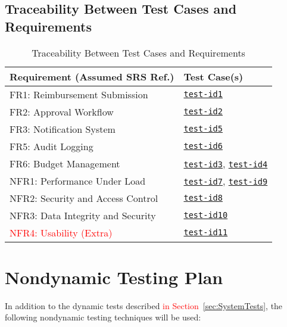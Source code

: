 \documentclass[12pt, titlepage]{article}
\begin{document}
\subsection{Traceability Between Test Cases and Requirements}

\begin{table}[h]
  \centering
  \caption{Traceability Between Test Cases and Requirements}
  \label{tab:req_test_trace}
  \begin{tabular}{|l|l|}
      \hline
      \textbf{Requirement (Assumed SRS Ref.)} & \textbf{Test Case(s)} \\
      \hline
      FR1: Reimbursement Submission & \hyperref[test-id1]{\texttt{test-id1}}\\
      FR2: Approval Workflow & \hyperref[test-id2]{\texttt{test-id2}}\\
      FR3: Notification System & \hyperref[test-id5]{\texttt{test-id5}}\\
      FR5: Audit Logging & \hyperref[test-id6]{\texttt{test-id6}}\\
      FR6: Budget Management & \hyperref[test-id3]{\texttt{test-id3}}, \hyperref[test-id4]{\texttt{test-id4}}\\
      NFR1: Performance Under Load & \hyperref[test-id7]{\texttt{test-id7}}, \hyperref[test-id9]{\texttt{test-id9}}\\
      NFR2: Security and Access Control & \hyperref[test-id8]{\texttt{test-id8}}\\
      NFR3: Data Integrity and Security & \hyperref[test-id10]{\texttt{test-id10}}\\
      \textcolor{red}{NFR4: Usability (Extra)} & \textcolor{red}{\hyperref[test-id11]{\texttt{test-id11}}}\\
      \hline
  \end{tabular}
\end{table}

\section{Nondynamic Testing Plan}
In addition to the dynamic tests described \textcolor{red}{in Section~\ref{sec:SystemTests}}, the following nondynamic testing techniques will be used:
\end{document}
